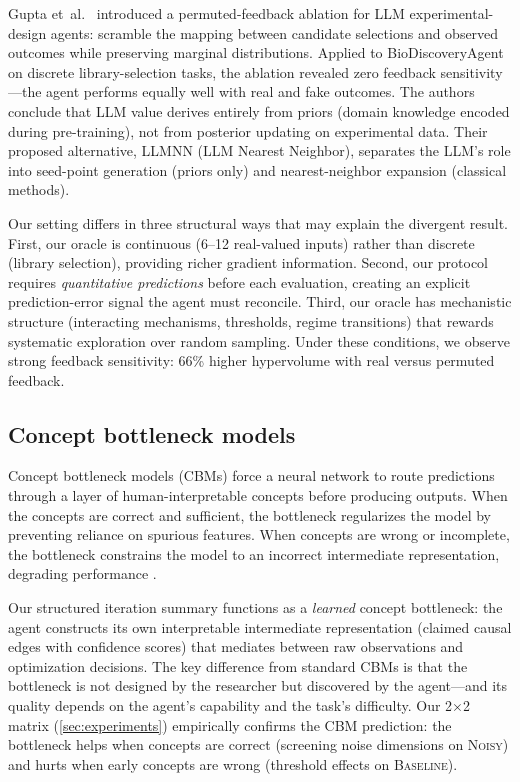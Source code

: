 \documentclass[11pt,letterpaper]{article}
\newcommand{\oracle}[1]{\textsc{#1}}
\newcommand{\baseline}{\oracle{Baseline}}
\newcommand{\noisy}{\oracle{Noisy}}
\begin{document}
Gupta et~al.\ \cite{gupta2025arewethereyet} introduced a
permuted-feedback ablation for LLM experimental-design agents: scramble
the mapping between candidate selections and observed outcomes while
preserving marginal distributions. Applied to BioDiscoveryAgent on
discrete library-selection tasks, the ablation revealed zero feedback
sensitivity---the agent performs equally well with real and fake
outcomes. The authors conclude that LLM value derives entirely from
priors (domain knowledge encoded during pre-training), not from
posterior updating on experimental data. Their proposed alternative,
LLMNN (LLM Nearest Neighbor), separates the LLM's role into seed-point
generation (priors only) and nearest-neighbor expansion (classical
methods).

Our setting differs in three structural ways that may explain the
divergent result. First, our oracle is continuous (6--12 real-valued
inputs) rather than discrete (library selection), providing richer
gradient information. Second, our protocol requires \emph{quantitative
predictions} before each evaluation, creating an explicit
prediction-error signal the agent must reconcile. Third, our oracle has
mechanistic structure (interacting mechanisms, thresholds, regime
transitions) that rewards systematic exploration over random sampling.
Under these conditions, we observe strong feedback sensitivity: 66\%
higher hypervolume with real versus permuted feedback.

\subsection{Concept bottleneck models}

Concept bottleneck models (CBMs) \cite{koh2020cbm} force a neural
network to route predictions through a layer of human-interpretable
concepts before producing outputs. When the concepts are correct and
sufficient, the bottleneck regularizes the model by preventing reliance
on spurious features. When concepts are wrong or incomplete, the
bottleneck constrains the model to an incorrect intermediate
representation, degrading performance \cite{yuksekgonul2023posthoc}.

Our structured iteration summary functions as a \emph{learned} concept
bottleneck: the agent constructs its own interpretable intermediate
representation (claimed causal edges with confidence scores) that
mediates between raw observations and optimization decisions. The key
difference from standard CBMs is that the bottleneck is not designed by
the researcher but discovered by the agent---and its quality depends on
the agent's capability and the task's difficulty. Our 2$\times$2 matrix
(\cref{sec:experiments}) empirically confirms the CBM prediction: the
bottleneck helps when concepts are correct (screening noise dimensions on
\noisy{}) and hurts when early concepts are wrong (threshold effects on
\baseline{}).
\end{document}
